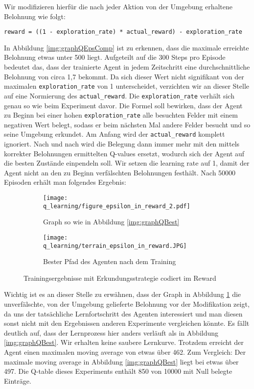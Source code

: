 Wir modifizieren hierfür die nach jeder Aktion von der Umgebung erhaltene Belohnung wie folgt:
\begin{verbatim}
reward = ((1 - exploration_rate) * actual_reward) - exploration_rate
\end{verbatim}
In Abbildung \ref{img:graphQEpsComp} ist zu erkennen, dass die maximale erreichte Belohnung etwas unter 500 liegt. Aufgeteilt auf die 300 Steps pro Episode bedeutet das, dass der trainierte Agent in jedem Zeitschritt eine durchschnittliche Belohnung von circa 1,7 bekommt. Da sich dieser Wert nicht signifikant von der maximalen \texttt{exploration_rate} von 1 unterscheidet, verzichten wir an dieser Stelle auf eine Normierung des \texttt{actual_reward}. Die \texttt{exploration_rate} verhält sich genau so wie beim Experiment davor. Die Formel soll bewirken, dass der Agent zu Beginn bei einer hohen \texttt{exploration_rate} alle besuchten Felder mit einem negativen Wert belegt, sodass er beim nächsten Mal andere Felder besucht und so seine Umgebung erkundet. Am Anfang wird der \texttt{actual_reward} komplett ignoriert. Nach und nach wird die Belegung dann immer mehr mit den mittels korrekter Belohnungen ermittelten Q-values ersetzt, wodurch sich der Agent auf die besten Zustände einpendeln soll. Wir setzen die learning rate auf 1, damit der Agent nicht an den zu Beginn verfälschten Belohnungen festhält. Nach 50000 Episoden erhält man folgendes Ergebnis:
\begin{figure}[H]
    \centering
    \begin{subfigure}[b]{0.49\textwidth}
        \texttt{[image: q\_learning/figure\_epsilon\_in\_reward\_2.pdf]}
        \caption{Graph so wie in Abbildung \ref{img:graphQBest}}
        \label{img:graphQEpsInRew}
    \end{subfigure}
    \begin{subfigure}[b]{0.49\textwidth}
        \texttt{[image: q\_learning/terrain\_epsilon\_in\_reward.JPG]}
        \caption{Bester Pfad des Agenten nach dem Training}
        \label{img:pathQEpsInRew}
    \end{subfigure}
    \caption{Trainingsergebnisse mit Erkundungsstrategie codiert im Reward}
\end{figure}
Wichtig ist es an dieser Stelle zu erwähnen, dass der Graph in Abbildung \ref{img:graphQEpsInRew} die unverfälschte, von der Umgebung gelieferte Belohnung vor der Modifikation zeigt, da uns der tatsächliche Lernfortschritt des Agenten interessiert und man diesen sonst nicht mit den Ergebnissen anderen Experimente vergleichen könnte. Es fällt deutlich auf, dass der Lernprozess hier anders verläuft als in Abbildung \ref{img:graphQBest}. Wir erhalten keine saubere Lernkurve. Trotzdem erreicht der Agent einen maximalen moving average von etwas über 462. Zum Vergleich: Der maximale moving average in Abbildung \ref{img:graphQBest} liegt bei etwas über 497. Die Q-table dieses Experiments enthält 850 von 10000 mit Null belegte Einträge.

